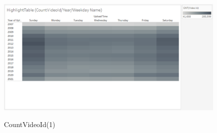 \documentclass[submit,techrep,noauthor]{ipsj}
\begin{document}
\begin{figure}[h]
\begin{minipage}[b]{0.49\columnwidth}
    \label{fig:highlighttable_countvideoid_weekday_month}
  \end{minipage}
  \begin{minipage}[b]{0.49\columnwidth}
    \centering
    \includegraphics[width=\columnwidth]{./eps/HighlightTable_CountVideoId_YearWeekdayName.eps}
    \label{fig:highlighttable_countvideoid_weekday_year}
  \end{minipage}
  \caption{CountVideoId(1)}
  \label{fig:highlighttable_countvideoid_year}
\end{figure}
\vspace{-3.0zh}
\end{document}
